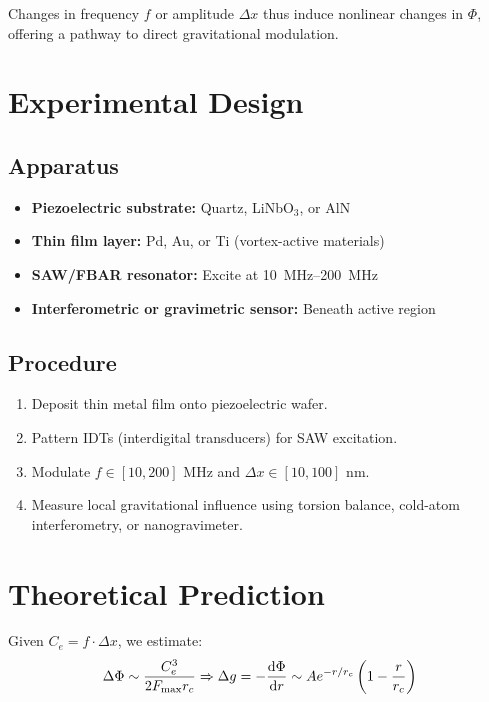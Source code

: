 \documentclass[12pt]{article}
\begin{document}
    Changes in frequency \( f \) or amplitude \( \Delta x \) thus induce nonlinear changes in \( \Phi \), offering a pathway to direct gravitational modulation.

    \section*{Experimental Design}
    \subsection*{Apparatus}
    \begin{itemize}
        \item \textbf{Piezoelectric substrate:} Quartz, LiNbO$_3$, or AlN
        \item \textbf{Thin film layer:} Pd, Au, or Ti (vortex-active materials)
        \item \textbf{SAW/FBAR resonator:} Excite at \SI{10}{MHz}--\SI{200}{MHz}
        \item \textbf{Interferometric or gravimetric sensor:} Beneath active region
    \end{itemize}

    \subsection*{Procedure}
    \begin{enumerate}
        \item Deposit thin metal film onto piezoelectric wafer.
        \item Pattern IDTs (interdigital transducers) for SAW excitation.
        \item Modulate \( f \in [10, 200] \) MHz and \( \Delta x \in [10, 100] \) nm.
        \item Measure local gravitational influence using torsion balance, cold-atom interferometry, or nanogravimeter.
    \end{enumerate}

    \section*{Theoretical Prediction}
    Given \( C_e = f \cdot \Delta x \), we estimate:
    \begin{equation}
        \Delta \Phi \sim \frac{C_e^3}{2 F_{\text{max}} r_c} \Rightarrow \Delta g = -\dv{\Phi}{r} \sim A e^{-r/r_c} \left(1 - \frac{r}{r_c}\right)
    \end{equation}
\end{document}
